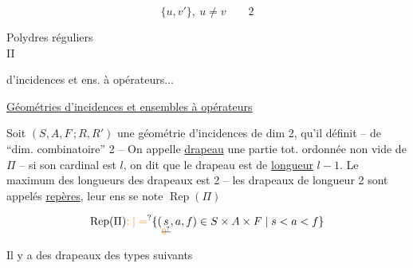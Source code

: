 \[
 \boxed{\{u{},v'\},\ u\ne v\qquad 2}
\]



Polydres réguliers\\
II

 d'incidences et ens. à opérateurs...



\uline{Géométries d'incidences et ensembles à opérateurs}

Soit \inserted{$\Pi=$} $(S,A,F\,;R,R')$  une géométrie d'incidences de dim 2,   qu'il définit -- de ``dim. combinatoire'' 2 -- On appelle \uline{drapeau}  une partie tot. ordonnée non vide de $\Pi$ -- si son cardinal est $l$, on dit que le drapeau est de \uline{longueur} $l-1$. Le maximum des longueurs des drapeaux est 2 -- les drapeaux de longueur 2 sont appelés \uline{repères}, leur ens se note $\operatorname{Rep}(\Pi)$

\[
 \operatorname{Rep}(\Pi)\unsure{:|=}\{(\underset{\deleted{\unsure{0}}}{s},a,f)\in S\times A\times F\mid s<a<f\}
\]

Il y a des drapeaux des types suivants




